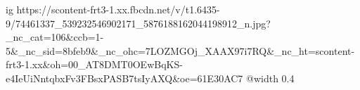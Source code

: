  
 
 
 
 

\ifcmt
  ig https://scontent-frt3-1.xx.fbcdn.net/v/t1.6435-9/74461337_539232546902171_5876188162044198912_n.jpg?_nc_cat=106&ccb=1-5&_nc_sid=8bfeb9&_nc_ohc=7LOZMGOj_XAAX97i7RQ&_nc_ht=scontent-frt3-1.xx&oh=00_AT8DMT0OEwBqKS-e4IeUiNntqbxFv3FBsxPASB7tsIyAXQ&oe=61E30AC7
  @width 0.4
\fi
